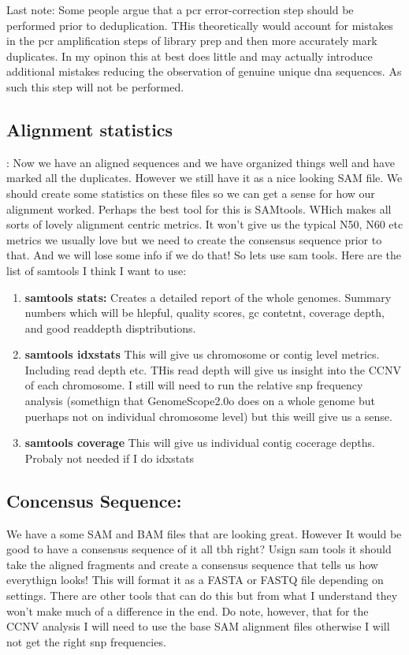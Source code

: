 \documentclass{article}
\begin{document}
    Last note:   Some people argue that a pcr error-correction step should be performed prior to deduplication.   THis theoretically would account for mistakes in the pcr amplification steps of library prep and then more accurately mark duplicates.   In my opinon this at best does little and may actually introduce additional mistakes reducing the observation of genuine unique dna sequences.   As such this step will not be performed.

    \newpage
    \subsection{\textbf{Alignment statistics}}:
    Now we have an aligned sequences and we have organized things well and have marked all the duplicates.  However we still have it as a nice looking SAM file.    We should create some statistics on these files so we can get a sense for how our alignment worked.   Perhaps the best tool for this is SAMtools.   WHich makes all sorts of lovely alignment centric metrics.   It won't give us the typical N50, N60 etc metrics we usually love but we need to create the consensus sequence prior to that.   And we will lose some info if we do that!   So lets use sam tools.   Here are the list of samtools I think I want to use:
    \begin{enumerate}
        \item \textbf{samtools stats:} Creates a detailed report of the whole genomes.   Summary numbers which will be hlepful, quality scores, gc contetnt, coverage depth, and good readdepth disptributions.
        \item \textbf{samtools idxstats} This will give us chromosome or contig level metrics.  Including read depth etc.   THis read depth will give us insight into the CCNV of each chromosome.   I still will need to run the relative snp frequency analysis (somethign that GenomeScope2.0o does on a whole genome but puerhaps not on individual chromosome level) but this weill give us a sense.
        \item \textbf{samtools coverage} This will give us individual contig cocerage depths.   Probaly not needed if I do idxstats
    \end{enumerate}

    \newpage
    \subsection{\textbf{Concensus Sequence:}}
    We have a some SAM and BAM files that are looking great.  However It would be good to have a consensus sequence of it all tbh right?   Usign sam tools it should take the aligned fragments and create a consensus sequence that tells us how everythign looks!  This will format it as a FASTA or FASTQ file depending on settings.   There are other tools that can do this but from what I understand they won't make much of a difference in the end.  Do note, however, that for the CCNV analysis I will need to use the base SAM alignment files otherwise I will not get the right snp frequencies.
\end{document}
